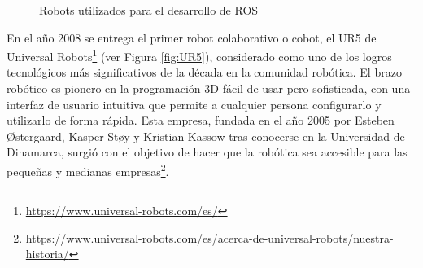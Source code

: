   \begin{figure}[H]
    \begin{center}
      \subcapcentertrue
      \hspace{2mm}
    \end{center}
    \caption{Robots utilizados para el desarrollo de ROS}
    \label{fig:PR_ROS}
  \end{figure}
    
En el año 2008 se entrega el primer robot colaborativo o cobot, el UR5 de Universal Robots\footnote{\url{https://www.universal-robots.com/es/}} (ver Figura \ref{fig:UR5}), considerado como uno de los logros tecnológicos más significativos de la década en la comunidad robótica. El brazo robótico es pionero en la programación 3D fácil de usar pero sofisticada, con una interfaz de usuario intuitiva que permite a cualquier persona configurarlo y utilizarlo de forma rápida. Esta empresa, fundada en el año 2005 por Esteben Østergaard, Kasper Støy y Kristian Kassow tras conocerse en la Universidad de Dinamarca, surgió con el objetivo de hacer que la robótica sea accesible para las pequeñas y medianas empresas\footnote{\url{https://www.universal-robots.com/es/acerca-de-universal-robots/nuestra-historia/}}.\\
  
